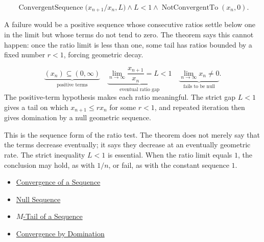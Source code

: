 \begin{remark*}
\[
\operatorname{ConvergentSequence}\bigl(x_{n+1}/x_n,L\bigr)
\land
L<1
\land
\operatorname{NotConvergentTo}(x_n,0).
\]
\end{remark*}

\begin{remark*}
A failure would be a positive sequence whose consecutive ratios settle below
one in the limit but whose terms do not tend to zero. The theorem says this
cannot happen: once the ratio limit is less than one, some tail has ratios
bounded by a fixed number $r<1$, forcing geometric decay.
\end{remark*}

\begin{remark*}
\[
\underbrace{(x_n)\subseteq(0,\infty)}_{\text{positive terms}}
\quad
\underbrace{\lim_{n\to\infty}\frac{x_{n+1}}{x_n}=L<1}_{\text{eventual ratio gap}}
\quad
\underbrace{\lim_{n\to\infty}x_n\neq 0}_{\text{fails to be null}}.
\]
The positive-term hypothesis makes each ratio meaningful. The strict gap
$L<1$ gives a tail on which $x_{n+1}\le r x_n$ for some $r<1$, and repeated
iteration then gives domination by a null geometric sequence.
\end{remark*}

\begin{remark*}[Interpretation]
This is the sequence form of the ratio test. The theorem does not merely say
that the terms decrease eventually; it says they decrease at an eventually
geometric rate. The strict inequality $L<1$ is essential. When the ratio
limit equals $1$, the conclusion may hold, as with $1/n$, or fail, as with
the constant sequence $1$.
\end{remark*}

\begin{remark*}[Dependencies]
\begin{itemize}
  \item \hyperref[def:convergent-sequence]{Convergence of a Sequence}
  \item \hyperref[def:null-sequence]{Null Sequence}
  \item \hyperref[def:m-tail]{$M$-Tail of a Sequence}
  \item \hyperref[thm:convergence-by-domination]{Convergence by Domination}
\end{itemize}
\end{remark*}
